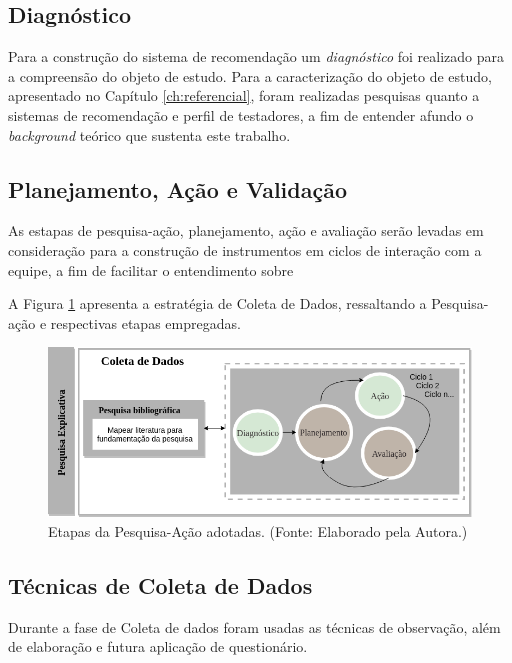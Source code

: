 \subsection{Diagnóstico}

Para a construção do sistema de recomendação um \textit{diagnóstico} foi realizado para a compreensão do objeto de estudo. Para a caracterização do objeto de estudo, apresentado no Capítulo \ref{ch:referencial}, foram realizadas pesquisas quanto a sistemas de recomendação e perfil de testadores, a fim de entender afundo o \textit{background} teórico que sustenta este trabalho.

\subsection{Planejamento, Ação e Validação}

As estapas de pesquisa-ação, planejamento, ação e avaliação serão levadas em consideração para a construção de instrumentos em ciclos de interação com a equipe, a fim de facilitar o entendimento sobre 

A Figura \ref{fig:etapasPesquisaAcaoAdotas} apresenta a estratégia de Coleta de Dados, ressaltando a Pesquisa-ação e respectivas etapas empregadas.

        \begin{figure}[H]
          \centering
          \includegraphics[width=12cm]{figuras/etapasPesquisaAcaoAdotadas.png}
          \caption{Etapas da Pesquisa-Ação adotadas. (Fonte: Elaborado pela Autora.)} 
          \label{fig:etapasPesquisaAcaoAdotas}
        
        \end{figure}
        
\subsection{Técnicas de Coleta de Dados}

Durante a fase de Coleta de dados foram usadas as técnicas de observação, além de elaboração e futura aplicação de questionário. 

